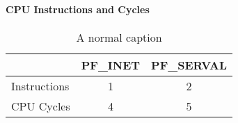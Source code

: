 \paragraph{CPU Instructions and Cycles}

\begin{table}
\begin{center}
  \begin{tabular}{lcc}
  	\toprule
  		&	PF\_INET & PF\_SERVAL \\
  	\midrule
    Instructions	&	1 	&	2	\\
    CPU Cycles	&	4	&	5	\\
    \bottomrule
  \end{tabular}
  \caption[Test]{A normal caption}
\end{center}
\end{table}
